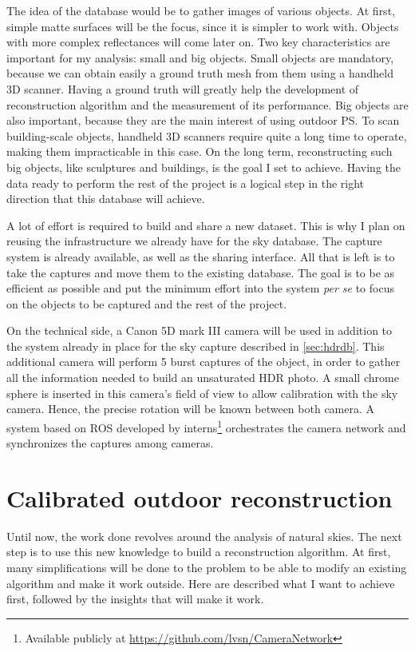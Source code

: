 \documentclass{report}
\begin{document}
The idea of the database would be to gather images of various objects. At first, simple matte surfaces will be the focus, since it is simpler to work with. Objects with more complex reflectances will come later on. Two key characteristics are important for my analysis: small and big objects. Small objects are mandatory, because we can obtain easily a ground truth mesh from them using a handheld 3D scanner. Having a ground truth will greatly help the development of reconstruction algorithm and the measurement of its performance. Big objects are also important, because they are the main interest of using outdoor PS. To scan building-scale objects, handheld 3D scanners require quite a long time to operate, making them impracticable in this case. On the long term, reconstructing such big objects, like sculptures and buildings, is the goal I set to achieve. Having the data ready to perform the rest of the project is a logical step in the right direction that this database will achieve. 

A lot of effort is required to build and share a new dataset. This is why I plan on reusing the infrastructure we already have for the sky database. The capture system is already available, as well as the sharing interface. All that is left is to take the captures and move them to the existing database. The goal is to be as efficient as possible and put the minimum effort into the system \emph{per se} to focus on the objects to be captured and the rest of the project.

On the technical side, a Canon 5D mark III camera will be used in addition to the system already in place for the sky capture described in \ref{sec:hdrdb}. This additional camera will perform 5 burst captures of the object, in order to gather all the information needed to build an unsaturated HDR photo. A small chrome sphere is inserted in this camera's field of view to allow calibration with the sky camera. Hence, the precise rotation will be known between both camera. A system based on ROS developed by interns\footnote{Available publicly at \url{https://github.com/lvsn/CameraNetwork}} orchestrates the camera network and synchronizes the captures among cameras.


\section{Calibrated outdoor reconstruction}
\label{sec:calib}

Until now, the work done revolves around the analysis of natural skies. The next step is to use this new knowledge to build a reconstruction algorithm. At first, many simplifications will be done to the problem to be able to modify an existing algorithm and make it work outside. Here are described what I want to achieve first, followed by the insights that will make it work.
\end{document}
